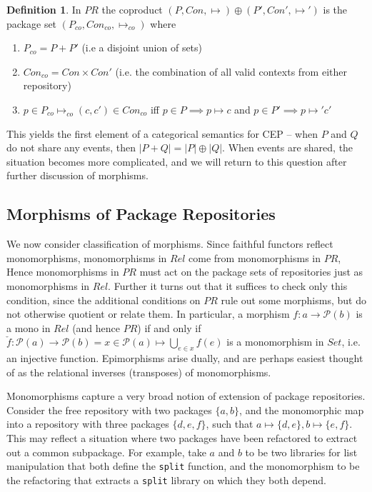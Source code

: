 \documentclass[hoptionsi,review,screen,format=sigconf]{acmart}
\theoremstyle{definition}
\newtheorem{definition}{Definition}[section]
\newcommand{\Pc}{\mathcal{P}}
\newcommand{\PRb}{\mathit{PR}}
\newcommand{\Relb}{\mathit{Rel}}
\newcommand{\Setb}{\mathit{Set}}
\begin{document}
\begin{definition}
In \(\PRb\) the coproduct \((P, Con, \mapsto) \oplus (P',Con', \mapsto ')\) is the package set \((P_{co},Con_{co},\mapsto_{co})\) where

  \begin{enumerate}
   \item \(P_{co} = P + P'\) (i.e a disjoint union of sets)
   \item \(Con_{co} = Con \times Con'\) (i.e. the combination of all valid contexts from either repository)
   \item \(p \in P_{co} \mapsto_{co} (c,c') \in Con_{co}\) iff \(p \in P \implies p \mapsto c\) and \(p \in P' \implies p \mapsto ' c'\)
   
  \end{enumerate}
\end{definition}

This yields the first element of a categorical semantics for CEP -- when \(P\) and \(Q\) do not share any events, then \(|P + Q| = |P| \oplus |Q|\). When events are shared, the situation becomes more complicated, and we will return to this question after further discussion of morphisms.


\subsection{Morphisms of Package Repositories}

We now consider classification of morphisms. Since faithful functors reflect monomorphisms, monomorphisms in \(\Relb\) come from monomorphisms in \(\PRb\), Hence monomorphisms in \(\PRb\) must act on the package sets of repositories just as monomorphisms in \(\Relb\). Further it turns out that it suffices to check only this condition, since the additional conditions on \(\PRb\) rule out some morphisms, but do not otherwise quotient or relate them. In particular, a morphism \(f : a \to \Pc(b)\) is a mono in \(\Relb\) (and hence \(\PRb\)) if and only if \(\check{f} : \Pc(a) \to \Pc(b) = x \in \Pc(a) \mapsto {\bigcup}_{e \in x} f(e)\) is a monomorphism in \(\Setb\), i.e. an injective function. Epimorphisms arise dually, and are perhaps easiest thought of as the relational inverses (transposes) of monomorphisms.


Monomorphisms capture a very broad notion of extension of package repositories. Consider the free repository with two packages \(\{a,b\}\), and the monomorphic map into a repository with three packages \(\{d,e,f\}\), such that \(a \mapsto \{d,e\}, b \mapsto \{e,f\}\). This may reflect a situation where two packages have been refactored to extract out a common subpackage. For example, take \(a\) and \(b\) to be two libraries for list manipulation that both define the \texttt{split} function, and the monomorphism to be the refactoring that extracts a \texttt{split} library on which they both depend.
\end{document}
